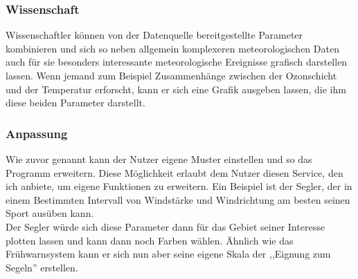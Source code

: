 \subsubsection{Wissenschaft} %
Wissenschaftler können von der Datenquelle bereitgestellte Parameter kombinieren
und sich so neben allgemein komplexeren meteorologischen Daten
auch für sie besonders interessante meteorologische Ereignisse grafisch darstellen lassen.
Wenn jemand zum Beispiel Zusammenhänge zwischen der Ozonschicht und der Temperatur erforscht,
kann er sich eine Grafik ausgeben lassen, die ihm diese beiden Parameter darstellt.

\subsubsection{Anpassung} %
Wie zuvor genannt kann der Nutzer eigene Muster einstellen und so das Programm erweitern.
Diese Möglichkeit erlaubt dem Nutzer diesen Service,
den ich anbiete, um eigene Funktionen zu erweitern.
Ein Beispiel ist der Segler, der in einem Bestimmten
Intervall von Windstärke und Windrichtung am besten seinen Sport ausüben kann.\\
Der Segler würde sich diese Parameter dann für das Gebiet seiner
Interesse plotten lassen und kann dann noch Farben wählen.
Ähnlich wie das Frühwarnsystem kann er sich nun aber
seine eigene Skala der ,,Eignung zum Segeln'' erstellen.

